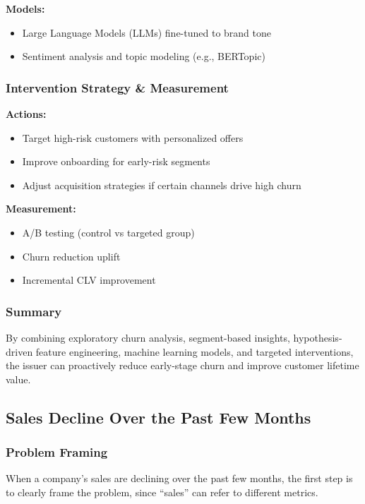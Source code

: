 \documentclass[10pt,a4paper]{article}
\begin{document}
	\textbf{Models:}
	\begin{itemize}
	    \item Large Language Models (LLMs) fine-tuned to brand tone
	    \item Sentiment analysis and topic modeling (e.g., BERTopic)
	\end{itemize}
	
	\subsubsection{Intervention Strategy \& Measurement}
	
	\textbf{Actions:}
	\begin{itemize}
	    \item Target high-risk customers with personalized offers
	    \item Improve onboarding for early-risk segments
	    \item Adjust acquisition strategies if certain channels drive high churn
	\end{itemize}
	
	\textbf{Measurement:}
	\begin{itemize}
	    \item A/B testing (control vs targeted group)
	    \item Churn reduction uplift
	    \item Incremental CLV improvement
	\end{itemize}
	
	\subsubsection{Summary}
	
	By combining exploratory churn analysis, segment-based insights, hypothesis-driven feature engineering, machine learning models, and targeted interventions, the issuer can proactively reduce early-stage churn and improve customer lifetime value.
	
	\subsection{Sales Decline Over the Past Few Months}
	
	\subsubsection{Problem Framing}
	
	When a company’s sales are declining over the past few months, the first step is to clearly frame the problem, since ``sales'' can refer to different metrics.
	
\end{document}
